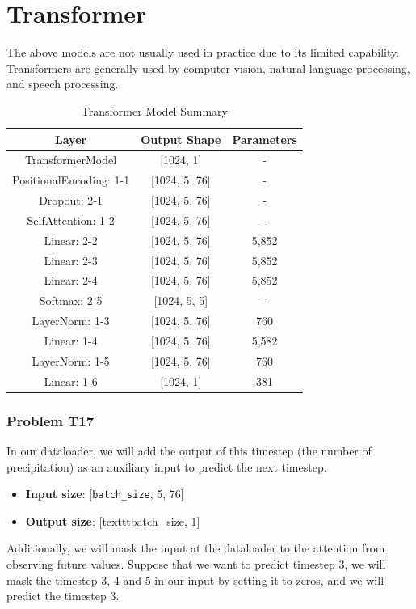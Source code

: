 \documentclass[12pt, a4paper]{article}
\begin{document}
    \pagebreak

    \part{Transformer}
        The above models are not usually used in practice due to its limited capability.
        Transformers are generally used by computer vision, natural language processing, and speech processing.

        \begin{table}[h]
            \centering
            \begin{tabular}{|c|c|c|}
                \hline
                \textbf{Layer} & \textbf{Output Shape} & \textbf{Parameters} \\
                \hline \hline
                TransformerModel & [1024, 1] & - \\
                PositionalEncoding: 1-1 & [1024, 5, 76] & - \\
                Dropout: 2-1 & [1024, 5, 76] & - \\
                SelfAttention: 1-2 & [1024, 5, 76] & - \\
                Linear: 2-2 & [1024, 5, 76] & 5,852 \\
                Linear: 2-3 & [1024, 5, 76] & 5,852 \\
                Linear: 2-4 & [1024, 5, 76] & 5,852 \\
                Softmax: 2-5 & [1024, 5, 5] & - \\
                LayerNorm: 1-3 & [1024, 5, 76] & 760 \\
                Linear: 1-4 & [1024, 5, 76] & 5,582 \\
                LayerNorm: 1-5 & [1024, 5, 76] & 760 \\
                Linear: 1-6 & [1024, 1] & 381 \\
                \hline
            \end{tabular}
            \caption{Transformer Model Summary}
        \end{table}

    \pagebreak

        \section{Problem T17}
            In our dataloader, we will add the output of this timestep (the number of precipitation) as an auxiliary input to predict the next timestep.
            \begin{itemize}
                \item \textbf{Input size}: [\texttt{batch\_size}, 5, 76]
                \item \textbf{Output size}: [texttt{batch\_size}, 1]
            \end{itemize}
            Additionally, we will mask the input at the dataloader to the attention from observing future values.
            Suppose that we want to predict timestep 3, we will mask the timestep 3, 4 and 5 in our input by setting it to zeros,
            and we will predict the timestep 3.
\end{document}
